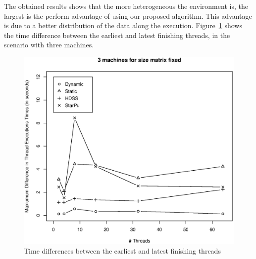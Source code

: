 \documentclass[journal]{IEEEtran}
\begin{document}
The obtained results shows that the more heterogeneous the environment is, the
largest is the perform advantage of using our proposed algorithm. This advantage
is due to a better distribution of the data along the
execution. Figure~\ref{fig:diferencaThreads} shows the time difference between
the earliest and latest finishing threads, in the scenario with three machines.

\begin{figure}[htb]
	\begin{center}
	\centering
			\includegraphics[scale=0.3]{MaximaDiferenca.eps}
	\caption{Time differences between the earliest and latest finishing threads}
	\label{fig:diferencaThreads}
	\end{center}
\end{figure}



\end{document}
